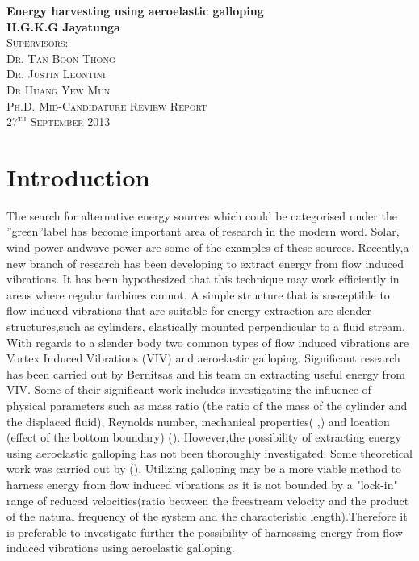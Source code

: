 \documentclass{article}
\begin{document}
\begin{titlepage}
\begin{center}
{\huge \bfseries Energy harvesting using aeroelastic galloping}\\[2.5cm]
{\LARGE \bfseries H.G.K.G Jayatunga}\\[2.5cm]
\textsc{\Large Supervisors:\\[0.5cm] Dr. Tan Boon Thong \\[0.4cm] Dr. Justin Leontini \\[0.5cm] Dr Huang Yew Mun}\\[6.5cm]
\textsc{\Large Ph.D. Mid-Candidature Review Report}\\

\vfill
\textsc{\Large $27^{\text{th}}$ September 2013}
\end{center}
\end{titlepage}
\tableofcontents

\section{Introduction}
The search for alternative energy sources which could be categorised under the ”green”label has become important area of research in the modern word. Solar, wind power andwave power are some of the examples of these sources. Recently,a new branch of research has been developing to extract energy from flow induced vibrations. It has been hypothesized that this technique may work efficiently in areas where regular turbines cannot.
A simple structure that is susceptible to flow-induced vibrations that are suitable for energy extraction are slender structures,such as cylinders, elastically mounted perpendicular to a fluid stream. With regards to a slender body two common types of   flow induced vibrations are Vortex Induced Vibrations (VIV) and aeroelastic galloping. Significant research has been carried out by Bernitsas and his team on extracting useful energy from VIV. Some of their significant work includes investigating the influence  of physical parameters such as mass ratio (the ratio of the mass of the cylinder and the displaced fluid), Reynolds number, mechanical properties(\cite{Raghavan2010a} ,\cite{Lee2011b}) and location (effect of the bottom boundary) (\cite{Raghavan2009}). However,the possibility of extracting energy using aeroelastic galloping has not been thoroughly investigated. Some theoretical work was carried out by (\cite{Barrero-Gil2010a}). Utilizing galloping may be a more viable method to harness energy from flow induced vibrations as it is not bounded by a "lock-in" range of reduced velocities(ratio between the freestream velocity and the product of the natural frequency of the system and the characteristic length).Therefore it is preferable to investigate further the possibility of harnessing energy from flow induced vibrations using aeroelastic galloping. 
\end{document}
